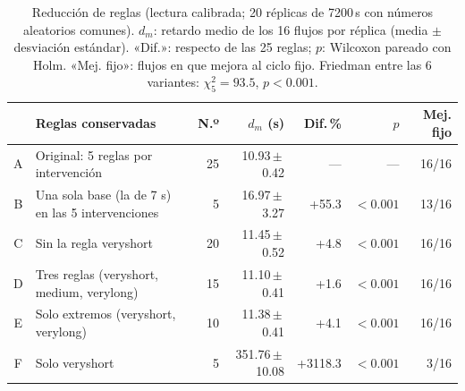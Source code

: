 \begin{table}[!t]
\caption{Reducción de reglas (lectura calibrada; 20 réplicas de 7200\,s con números aleatorios comunes). $d_m$: retardo medio de los 16 flujos por réplica (media $\pm$ desviación estándar). «Dif.»: respecto de las 25 reglas; $p$: Wilcoxon pareado con Holm. «Mej. fijo»: flujos en que mejora al ciclo fijo. Friedman entre las 6 variantes: $\chi^2_5=93.5$, $p<0.001$.}
\label{tab:ablacion}
\centering
\scriptsize
\setlength{\tabcolsep}{1.6pt}
\begin{tabular}{@{}cp{}rrrrr@{}}
\toprule
 & Reglas conservadas & N.º & $d_m$ (s) & Dif.\,\% & $p$ & Mej. fijo \\
\midrule
A & Original: 5 reglas por intervención & 25 & 10.93\,$\pm$\,0.42 & --- & --- & 16/16 \\
B & Una sola base (la de 7 s) en las 5 intervenciones & 5 & 16.97\,$\pm$\,3.27 & +55.3 & $<0.001$ & 13/16 \\
C & Sin la regla veryshort & 20 & 11.45\,$\pm$\,0.52 & +4.8 & $<0.001$ & 16/16 \\
D & Tres reglas (veryshort, medium, verylong) & 15 & 11.10\,$\pm$\,0.41 & +1.6 & $<0.001$ & 16/16 \\
E & Solo extremos (veryshort, verylong) & 10 & 11.38\,$\pm$\,0.41 & +4.1 & $<0.001$ & 16/16 \\
F & Solo veryshort & 5 & 351.76\,$\pm$\,10.08 & +3118.3 & $<0.001$ & 3/16 \\
\bottomrule
\end{tabular}
\end{table}
